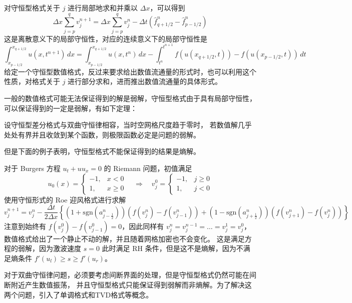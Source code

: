对守恒型格式关于 $j$ 进行局部地求和并乘以 $\Delta x$，可以得到
\[
    \Delta x\sum_{j=p}^q v_j^{n+1}  = \Delta x\sum_{j=p}^q v_j^n  -  \Delta t
    \left(
    \hat{f}_{q+1/2}^n - \hat{f}_{p-1/2}^n
    \right)
\]
这是离散意义下的局部守恒性，对应的连续意义下的局部守恒性是
\[
    \int_{x_{p-1/2}}^{x_{q+1/2}} u(x,t^{n+1}) \,dx
    =
    \int_{x_{p-1/2}}^{x_{q+1/2}} u(x,t^n)\,dx
    - \int_{t^n}^{t^{n+1}} f(u(x_{q+1/2},t)) - f(u(x_{p-1/2},t))\,dt
\]
给定一个守恒型数值格式，反过来要求给出数值流通量的形式时，也可以利用这个性质，对格式关于 $j$ 进行部分求和，进而推出数值流通量的具体形式。



一般的数值格式可能无法保证得到的解是弱解，守恒型格式由于具有局部守恒性，可以保证得到的一定是弱解，有如下定理：
\begin{theorem}
    设守恒型差分格式与双曲守恒律相容，当时空网格尺度趋于零时，
    若数值解几乎处处有界并且收敛到某个函数，则极限函数必定是问题的弱解。
\end{theorem}

但是下面的例子表明，守恒型格式不能保证得到的结果是熵解。

\begin{example}
    对于 Burgers 方程 $u_t + u u_x = 0$ 的 Riemann 问题，初值满足
    \[
        u_0(x) =
        \begin{cases}
            -1, & x < 0   \\
            1,  & x \ge 0
        \end{cases} \quad \Rightarrow \quad  v_j^0 =
        \begin{cases}
            -1, & j \ge 0 \\
            1,  & j < 0
        \end{cases}
    \]
    使用守恒形式的 Roe 迎风格式进行求解
    \[
        v_j^{n+1} = v_j^n - \frac{\Delta t}{2\Delta x}
        \left\{
        (1+\text{sgn}(a_{j-\frac12}^n))(f(v_{j}^n)-f(v_{j-1}^n))
        + (1-\text{sgn}(a_{j+\frac12}^n))(f(v_{j+1}^n)-f(v_{j}^n))
        \right\}
    \]
    注意到始终有 $f(v_{j}^0)-f(v_{j-1}^0) = 0$，因此同样有 $v_j^n = v_j^{n-1} = \dots = v_j^1 = v_j^0$，
    数值格式给出了一个静止不动的解，并且随着网格加密也不会变化。
    这是满足方程的弱解，因为激波速度 $s = 0$ 此时满足 RH 条件，但是这不是熵解，因为不满足熵条件 $f'(u_l) \ge s \ge f'(u_r)$。
\end{example}


对于双曲守恒律问题，必须要考虑间断界面的处理，但是守恒型格式仍然可能在间断附近产生数值振荡，
并且守恒型格式只能保证得到弱解而非熵解。为了解决这两个问题，引入了单调格式和TVD格式等概念。


